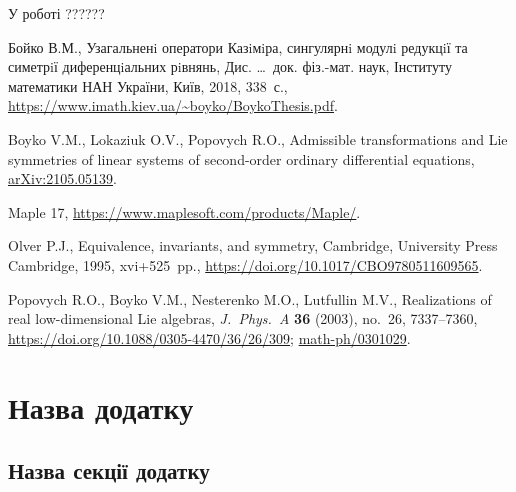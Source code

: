 \documentclass{thesis}
\begin{document}
У роботі ??????

\newpage

\renewcommand{\bibname}{Список використаних джерел}

\begin{thebibliography}{99}
\itemsep=0pt

Бойко В.М.,
Узагальненi оператори Казiмiра,
сингулярнi модулi редукцiї
та симетрiї диференцiальних рiвнянь,
Дис. \dots\ док. фіз.-мат. наук,  Інституту математики НАН України, Київ, 2018, 338~с., \url{https://www.imath.kiev.ua/~boyko/BoykoThesis.pdf}.



Boyko V.M., Lokaziuk O.V., Popovych R.O.,
Admissible transformations and Lie symmetries of linear systems of second-order ordinary differential equations, \href{https://arxiv.org/abs/2105.05139}{arXiv:2105.05139}.

Maple 17, \url{https://www.maplesoft.com/products/Maple/}.


Olver P.J., Equivalence, invariants, and symmetry, Cambridge, University Press Cambridge, 1995, xvi+525~pp.,
\url{https://doi.org/10.1017/CBO9780511609565}.


Popovych R.O., Boyko V.M., Nesterenko M.O., Lutfullin M.V., Realizations of real low-dimensional Lie algebras, \textit{J.~Phys.~A} \textbf{36} (2003), no.~26,
7337--7360, \url{https://doi.org/10.1088/0305-4470/36/26/309}; \href{https://arxiv.org/abs/math-ph/0301029}{math-ph/0301029}.



\end{thebibliography}

\appendix

\chapter{Назва додатку}\label{appendix1}

\section{Назва секції додатку}\label{appendix1.1}
\end{document}
